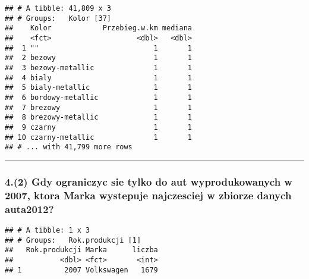 \documentclass[]{article}
\newenvironment{Shaded}{\begin{snugshade}}{\end{snugshade}}
\newcommand{\KeywordTok}[1]{\textcolor[rgb]{0.13,0.29,0.53}{\textbf{#1}}}
\newcommand{\DataTypeTok}[1]{\textcolor[rgb]{0.13,0.29,0.53}{#1}}
\newcommand{\DecValTok}[1]{\textcolor[rgb]{0.00,0.00,0.81}{#1}}
\newcommand{\StringTok}[1]{\textcolor[rgb]{0.31,0.60,0.02}{#1}}
\newcommand{\OperatorTok}[1]{\textcolor[rgb]{0.81,0.36,0.00}{\textbf{#1}}}
\newcommand{\NormalTok}[1]{#1}
\begin{document}
\begin{verbatim}
## # A tibble: 41,809 x 3
## # Groups:   Kolor [37]
##    Kolor            Przebieg.w.km mediana
##    <fct>                    <dbl>   <dbl>
##  1 ""                           1       1
##  2 bezowy                       1       1
##  3 bezowy-metallic              1       1
##  4 bialy                        1       1
##  5 bialy-metallic               1       1
##  6 bordowy-metallic             1       1
##  7 brezowy                      1       1
##  8 brezowy-metallic             1       1
##  9 czarny                       1       1
## 10 czarny-metallic              1       1
## # ... with 41,799 more rows
\end{verbatim}

\begin{center}\rule{0.5\linewidth}{\linethickness}\end{center}

\subsubsection{4.(2) Gdy ograniczyc sie tylko do aut wyprodukowanych w
2007, ktora Marka wystepuje najczesciej w zbiorze danych
auta2012?}\label{gdy-ograniczyc-sie-tylko-do-aut-wyprodukowanych-w-2007-ktora-marka-wystepuje-najczesciej-w-zbiorze-danych-auta2012}

\begin{Shaded}
\end{Shaded}

\begin{verbatim}
## # A tibble: 1 x 3
## # Groups:   Rok.produkcji [1]
##   Rok.produkcji Marka      liczba
##           <dbl> <fct>       <int>
## 1          2007 Volkswagen   1679
\end{verbatim}
\end{document}
